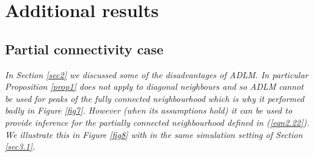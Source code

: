 \documentclass{article}
\newcommand{\nt}[1]{\textit{\color{red} #1}}
\begin{document}
\section{Additional results}
\label{appendix.e}
\subsection{Partial connectivity case}
\label{appendix.d1}
\nt{In Section \ref{sec2} we discussed some of the disadvantages of ADLM. In particular Proposition \ref{prop1} does not apply to diagonal neighbours and so ADLM cannot be used for peaks of the fully connected neighbourhood which is why it performed badly in Figure \ref{fig7}. However (when its assumptions hold) it can be used to provide inference  for the partially connected neighbourhood defined in (\eqref{eqn2.22}). We illustrate this in Figure \ref{fig8} with in the same simulation setting of Section \ref{sec3.1}.}
\end{document}

